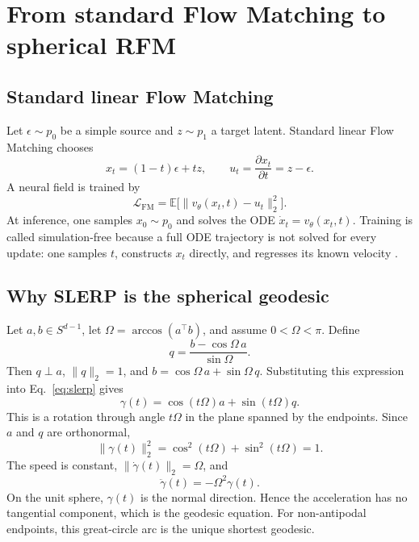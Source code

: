 \documentclass{article}
\begin{document}
\section{From standard Flow Matching to spherical RFM}
\label{app:fm}
\subsection{Standard linear Flow Matching}
Let $\epsilon\sim p_0$ be a simple source and $z\sim p_1$ a target latent. Standard linear Flow Matching chooses
\begin{equation}
 x_t=(1-t)\epsilon+tz,\qquad
 u_t=\frac{\partial x_t}{\partial t}=z-\epsilon.
\end{equation}
A neural field is trained by
\begin{equation}
 \mathcal L_{\mathrm{FM}}
 =\mathbb E\big[\|v_\theta(x_t,t)-u_t\|_2^2\big].
\end{equation}
At inference, one samples $x_0\sim p_0$ and solves the ODE $\dot x_t=v_\theta(x_t,t)$. Training is called simulation-free because a full ODE trajectory is not solved for every update: one samples $t$, constructs $x_t$ directly, and regresses its known velocity \cite{fm}.

\subsection{Why SLERP is the spherical geodesic}
Let $a,b\in S^{d-1}$, let $\Omega=\arccos(a^\top b)$, and assume $0<\Omega<\pi$. Define
\begin{equation}
 q=\frac{b-\cos\Omega\,a}{\sin\Omega}.
\end{equation}
Then $q\perp a$, $\|q\|_2=1$, and $b=\cos\Omega\,a+\sin\Omega\,q$. Substituting this expression into Eq.~\eqref{eq:slerp} gives
\begin{equation}
 \gamma(t)=\cos(t\Omega)a+\sin(t\Omega)q.
\end{equation}
This is a rotation through angle $t\Omega$ in the plane spanned by the endpoints. Since $a$ and $q$ are orthonormal,
\begin{equation}
 \|\gamma(t)\|_2^2=\cos^2(t\Omega)+\sin^2(t\Omega)=1.
\end{equation}
The speed is constant, $\|\dot\gamma(t)\|_2=\Omega$, and
\begin{equation}
 \ddot\gamma(t)=-\Omega^2\gamma(t).
\end{equation}
On the unit sphere, $\gamma(t)$ is the normal direction. Hence the acceleration has no tangential component, which is the geodesic equation. For non-antipodal endpoints, this great-circle arc is the unique shortest geodesic.
\end{document}

